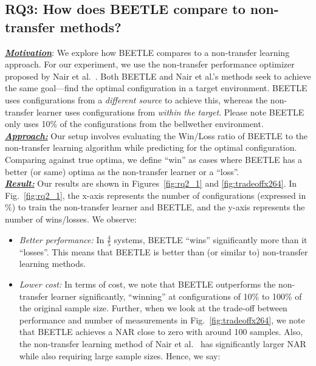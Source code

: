 \documentclass[10pt,journal,compsoc]{IEEEtran}
\newcommand{\fig}[1]{Fig.~\ref{fig:#1}}
\begin{document}
 
 
\vspace{-0.1cm}
\subsection*{RQ3: How does BEETLE compare to non-transfer  methods?}
\label{sect:rq2}

\noindent\textbf{\textit{\underline{Motivation}}}: We explore how BEETLE  compares to a non-transfer learning approach. For our experiment, we use the non-transfer performance optimizer proposed by Nair et al.~\cite{nair2017using}.
Both BEETLE and Nair et al.'s methods seek to achieve the same goal---find the optimal configuration in a target environment. BEETLE uses configurations from a \textit{different source} to achieve this, whereas the non-transfer learner uses configurations from \textit{within the target}. Please note BEETLE only uses 10\% of the configurations from the bellwether environment.\\
\textbf{\textit{\underline{Approach:}}} Our setup involves evaluating the Win/Loss ratio of BEETLE to the non-transfer learning algorithm while predicting for the optimal configuration. Comparing against true optima, we define ``win'' as cases where BEETLE has a better (or same) optima as the non-transfer learner or a ``loss''.\\
\textbf{\textit{\underline{Result:}}}
Our results are shown in Figures~\ref{fig:rq2_1} and \ref{fig:tradeoffx264}. In \fig{rq2_1}, the x-axis represents the number of configurations (expressed in \%) to train the non-transfer learner and BEETLE, and the y-axis represents the number of wins/losses. We observe:
\begin{itemize}[leftmargin=*]
\item \textit{Better performance:} In $\frac{4}{5}$ systems, BEETLE ``wins'' significantly more than it ``losses''. This means that BEETLE is better than (or similar to) non-transfer learning methods. 
\item \textit{Lower cost:} In terms of cost, we note that BEETLE outperforms the non-transfer learner significantly, ``winning'' at configurations of 10\%  to 100\% of the original sample size. Further, when we look at the trade-off between performance and number of measurements in \fig{tradeoffx264}, we note that BEETLE achieves a NAR close to zero with around 100 samples. Also, the non-transfer learning method of Nair et al.~\cite{nair2017using} has significantly larger NAR while also requiring large sample sizes. Hence, we say:\\
\end{itemize}
\end{document}
